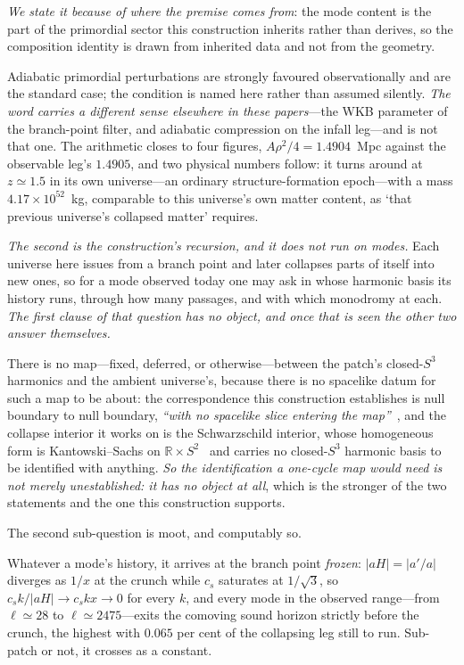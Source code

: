 \documentclass[11pt,a4paper]{article}
\theoremstyle{plain}
\theoremstyle{definition}
\theoremstyle{remark}
\begin{document}
\emph{We state it because of where the premise comes from}: the mode content is the part of the primordial sector this construction inherits rather than derives, so the composition identity is drawn from inherited data and not from the geometry. 

Adiabatic primordial perturbations are strongly favoured observationally and are the standard case; the condition is named here rather than assumed silently. \emph{The word carries a different sense elsewhere in these papers}---the WKB parameter of the branch-point filter, and adiabatic compression on the infall leg---and is not that one. The arithmetic closes to four figures, $A\rho^2/4=1.4904$~Mpc against the observable leg's $1.4905$, and two physical numbers follow: it turns around at $z\simeq1.5$ in its own universe---an ordinary structure-formation epoch---with a mass $4.17\times10^{52}$~kg, comparable to this universe's own matter content, as `that previous universe's collapsed matter' requires.

\emph{The second is the construction's recursion, and it does not run on modes.} Each universe here issues from a branch point and later collapses parts of itself into new ones, so for a mode observed today one may ask in whose harmonic basis its history runs, through how many passages, and with which monodromy at each. \emph{The first clause of that question has no object, and once that is seen the other two answer themselves.} 

There is no map---fixed, deferred, or otherwise---between the patch's closed-$S^3$ harmonics and the ambient universe's, because there is no spacelike datum for such a map to be about: the correspondence this construction establishes is null boundary to null boundary, \emph{``with no spacelike slice entering the map''}~\cite{JanzenCRframework}, and the collapse interior it works on is the Schwarzschild interior, whose homogeneous form is Kantowski--Sachs on $\mathbb{R}\times S^2$~\cite{JanzenRange} and carries no closed-$S^3$ harmonic basis to be identified with anything. \emph{So the identification a one-cycle map would need is not merely unestablished: it has no object at all}, which is the stronger of the two statements and the one this construction supports. 

The second sub-question is moot, and computably so. 

Whatever a mode's history, it arrives at the branch point \emph{frozen}: $|aH|=|a'/a|$ diverges as $1/x$ at the crunch while $c_s$ saturates at $1/\sqrt3$, so $c_sk/|aH|\to c_skx\to0$ for every $k$, and every mode in the observed range---from $\ell\simeq28$ to $\ell\simeq2475$---exits the comoving sound horizon strictly before the crunch, the highest with $0.065$ per cent of the collapsing leg still to run. Sub-patch or not, it crosses as a constant. 
\end{document}
